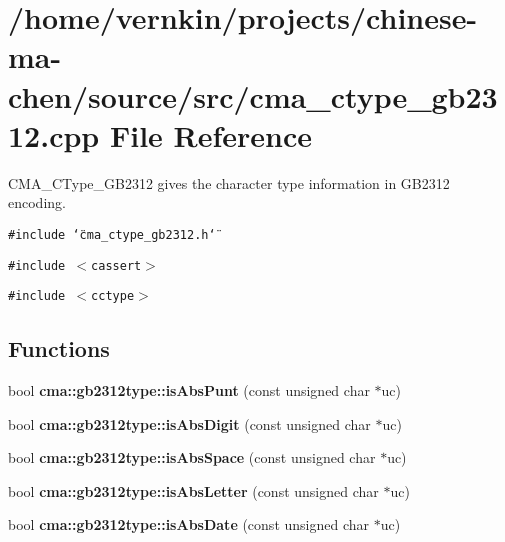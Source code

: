 \section{/home/vernkin/projects/chinese-ma-chen/source/src/cma\_\-ctype\_\-gb2312.cpp File Reference}
\label{cma__ctype__gb2312_8cpp}
CMA\_\-CType\_\-GB2312 gives the character type information in GB2312 encoding.  


{\tt \#include \char`\"{}cma\_\-ctype\_\-gb2312.h\char`\"{}}\par
{\tt \#include $<$cassert$>$}\par
{\tt \#include $<$cctype$>$}\par
\subsection*{Functions}
\begin{CompactItemize}
\item 
bool {\bf cma::gb2312type::isAbsPunt} (const unsigned char $\ast$uc)
\item 
bool {\bf cma::gb2312type::isAbsDigit} (const unsigned char $\ast$uc)
\item 
bool {\bf cma::gb2312type::isAbsSpace} (const unsigned char $\ast$uc)
\item 
bool {\bf cma::gb2312type::isAbsLetter} (const unsigned char $\ast$uc)
\item 
bool {\bf cma::gb2312type::isAbsDate} (const unsigned char $\ast$uc)
\end{CompactItemize}
